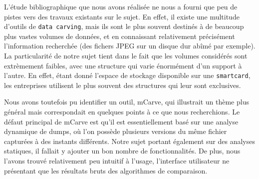 L'étude bibliographique que nous avons réalisée ne nous a fourni que peu de pistes vers des travaux existants sur le sujet. En effet, il existe une multitude d'outils de \texttt{data carving}, mais ils sont le plus souvent destinés à de beaucoup plus vastes volumes de données, et en connaissant relativement précisément l'information recherchée (des fichers JPEG sur un disque dur abîmé par exemple). La particularité de notre sujet tient dans le fait que les volumes considérés sont extrèmement faibles, avec une structure qui varie énormément d'un support à l'autre. En effet, étant donné l'espace de stockage disponible sur une \texttt{smartcard}, les entreprises utilisent le plus souvent des structures qui leur sont exclusives.

Nous avons toutefois pu identifier un outil, mCarve, qui illustrait un thème plus général mais correspondait en quelques points à ce que nous recherchions. Le défaut principal de mCarve est qu'il est essentiellement basé sur une analyse dynamique de dumps, où l'on possède plusieurs versions du même fichier capturées à des instants différents. Notre sujet portant également sur des analyses statiques, il fallait y ajouter un bon nombre de fonctionnalités. De plus, nous l'avons trouvé relativement peu intuitif à l'usage, l'interface utilisateur ne présentant que les résultats bruts des algorithmes de comparaison.
